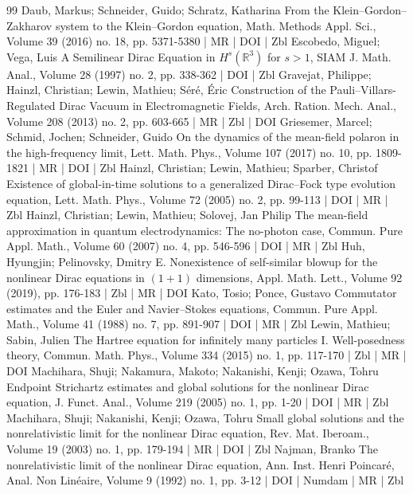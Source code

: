 \documentclass[10pt]{amsart}
\theoremstyle{definition}\newtheorem{defi}[theo]{Definition}\newtheorem{rema}[theo]{Remark}\newtheorem{exam}[theo]{Example}\newtheorem{exem}[theo]{Example}\newtheorem{nota}[theo]{Notation}
\begin{document}
\begin{thebibliography}{99}
Daub, Markus; Schneider, Guido; Schratz, Katharina From the Klein–Gordon–Zakharov system to the Klein–Gordon equation, Math. Methods Appl. Sci., Volume 39 (2016) no. 18, pp. 5371-5380 | MR | DOI | Zbl
Escobedo, Miguel; Vega, Luis A Semilinear Dirac Equation in ${H}^s(\mathbb{R}^3)$ for $s> 1$, SIAM J. Math. Anal., Volume 28 (1997) no. 2, pp. 338-362 | DOI | Zbl
Gravejat, Philippe; Hainzl, Christian; Lewin, Mathieu; Séré, Éric Construction of the Pauli–Villars-Regulated Dirac Vacuum in Electromagnetic Fields, Arch. Ration. Mech. Anal., Volume 208 (2013) no. 2, pp. 603-665 | MR | Zbl | DOI
Griesemer, Marcel; Schmid, Jochen; Schneider, Guido On the dynamics of the mean-field polaron in the high-frequency limit, Lett. Math. Phys., Volume 107 (2017) no. 10, pp. 1809-1821 | MR | DOI | Zbl
Hainzl, Christian; Lewin, Mathieu; Sparber, Christof Existence of global-in-time solutions to a generalized Dirac–Fock type evolution equation, Lett. Math. Phys., Volume 72 (2005) no. 2, pp. 99-113 | DOI | MR | Zbl
Hainzl, Christian; Lewin, Mathieu; Solovej, Jan Philip The mean-field approximation in quantum electrodynamics: The no-photon case, Commun. Pure Appl. Math., Volume 60 (2007) no. 4, pp. 546-596 | DOI | MR | Zbl
Huh, Hyungjin; Pelinovsky, Dmitry E. Nonexistence of self-similar blowup for the nonlinear Dirac equations in $(1+1)$ dimensions, Appl. Math. Lett., Volume 92 (2019), pp. 176-183 | Zbl | MR | DOI
Kato, Tosio; Ponce, Gustavo Commutator estimates and the Euler and Navier–Stokes equations, Commun. Pure Appl. Math., Volume 41 (1988) no. 7, pp. 891-907 | DOI | MR | Zbl
Lewin, Mathieu; Sabin, Julien The Hartree equation for infinitely many particles I. Well-posedness theory, Commun. Math. Phys., Volume 334 (2015) no. 1, pp. 117-170 | Zbl | MR | DOI
Machihara, Shuji; Nakamura, Makoto; Nakanishi, Kenji; Ozawa, Tohru Endpoint Strichartz estimates and global solutions for the nonlinear Dirac equation, J. Funct. Anal., Volume 219 (2005) no. 1, pp. 1-20 | DOI | MR | Zbl
Machihara, Shuji; Nakanishi, Kenji; Ozawa, Tohru Small global solutions and the nonrelativistic limit for the nonlinear Dirac equation, Rev. Mat. Iberoam., Volume 19 (2003) no. 1, pp. 179-194 | MR | DOI | Zbl
Najman, Branko The nonrelativistic limit of the nonlinear Dirac equation, Ann. Inst. Henri Poincaré, Anal. Non Linéaire, Volume 9 (1992) no. 1, pp. 3-12 | DOI | Numdam | MR | Zbl

\end{thebibliography}
\end{document}
